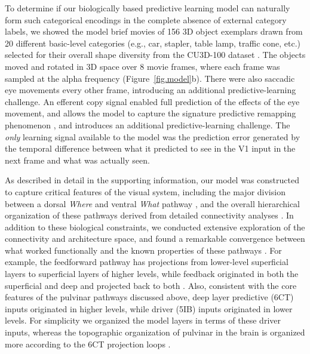 \documentclass[11pt,twoside]{article}
\newif\myifpdf
\begin{document}
To determine if our biologically based predictive learning model can naturally form such categorical encodings in the complete absence of external category labels, we showed the model brief movies of 156 3D object exemplars drawn from 20 different basic-level categories (e.g., car, stapler, table lamp, traffic cone, etc.) selected for their overall shape diversity from the CU3D-100 dataset \citep{OReillyWyatteHerdEtAl13}.  The objects moved and rotated in 3D space over 8 movie frames, where each frame was sampled at the alpha frequency (Figure~\ref{fig.model}b).  There were also saccadic eye movements every other frame, introducing an additional predictive-learning challenge.  An efferent copy signal enabled full prediction of the effects of the eye movement, and allows the model to capture the signature predictive remapping phenomenon \citep{DuhamelColbyGoldberg92,CavanaghHuntAfrazEtAl10}, and introduces an additional predictive-learning challenge.  The \emph{only} learning signal available to the model was the prediction error generated by the temporal difference between what it predicted to see in the V1 input in the next frame and what was actually seen.

As described in detail in the supporting information, our model was constructed to capture critical features of the visual system, including the major division between a dorsal \emph{Where} and ventral \emph{What} pathway \citep{UngerleiderMishkin82}, and the overall hierarchical organization of these pathways derived from detailed connectivity analyses \citep{RocklandPandya79,FellemanVanEssen91,MarkovVezoliChameauEtAl14,MarkovErcsey-RavaszGomesEtAl14}.  In addition to these biological constraints, we conducted extensive exploration of the connectivity and architecture space, and found a remarkable convergence between what worked functionally and the known properties of these pathways \citep{OReillyWyatteRohrlich17}.  For example, the feedforward pathway has projections from lower-level superficial layers to superficial layers of higher levels, while feedback originated in both the superficial and deep and projected back to both \citep{RocklandPandya79,FellemanVanEssen91}.  Also, consistent with the core features of the pulvinar pathways discussed above, deep layer predictive (6CT) inputs originated in higher levels, while driver (5IB) inputs originated in lower levels.  For simplicity we organized the model layers in terms of these driver inputs, whereas the topographic organization of pulvinar in the brain is organized more according to the 6CT projection loops \citep{Shipp03}.
\end{document}
